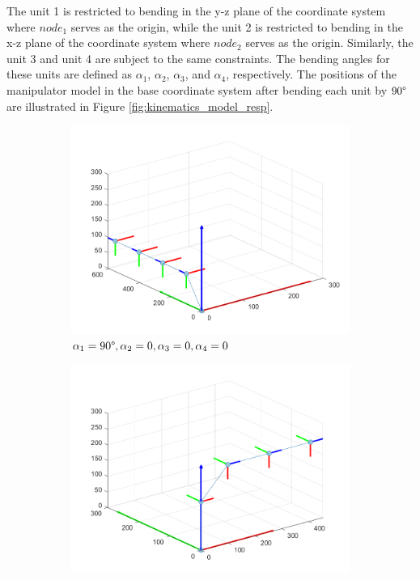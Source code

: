 \noindent The unit 1 is restricted to bending in the y-z plane of the coordinate system where $node_1$ serves as the origin, 
while the unit 2 is restricted to bending in the x-z plane of the coordinate system where $node_2$ serves as the origin. 
Similarly, the unit 3 and unit 4 are subject to the same constraints. The bending angles for these units are defined as 
$\alpha_1$, $\alpha_2$, $\alpha_3$, and $\alpha_4$, respectively. The positions of the manipulator model in the base coordinate 
system after bending each unit by $90 \degree$ are illustrated in Figure \ref{fig:kinematics_model_resp}.
\begin{figure}[H] %
    \centering %
    \captionsetup{labelsep=colon}
    \begin{subfigure}{0.48\textwidth} %
        \centering
        \includegraphics[width=\linewidth]{Image/MATLAB/manipulator_90_0_0_0.png}
        \caption{$\alpha_1=90 \degree,\alpha_2=0,\alpha_3=0,\alpha_4=0$}
    \end{subfigure}
    \hfill
    \begin{subfigure}{0.48\textwidth} %
        \centering
        \includegraphics[width=\linewidth]{Image/MATLAB/manipulator_0_90_0_0.png}

\end{subfigure}
\end{figure}
